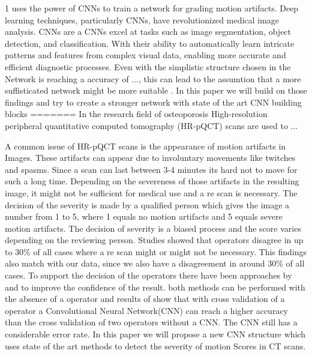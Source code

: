 \documentclass[
a4paper, 
12pt,
grayscalebody, %
abstract=on,
twoside, BCOR10mm, 12pt, DIV13,headinclude, footexclude, final, abstracton, openright
]{ibireprt}
\numberwithin{equation}{chapter}
\numberwithin{table}{chapter}
\numberwithin{figure}{chapter}
\numberwithin{algorithm}{chapter}
\numberwithin{example}{chapter}
\numberwithin{example}{chapter}
\begin{document}
1\cite{Sode2011} uses the power of CNNs to train a network for grading motion artifacts. Deep learning techniques, particularly CNNs, have revolutionized medical image analysis. CNNs are a %
CNNs excel at tasks such as image segmentation, object detection, and classification. With their ability to automatically learn intricate patterns and features from complex visual data, enabling more accurate and efficient diagnostic processes. %
Even with the simplistic structure chosen in \cite{Sode2011} the Network is reaching a accuracy of ..., this can lead to the assumtion that a more suffisticated network might be more suitable . In this paper we will build on those findings and try to create a stronger network with state of the art CNN building blocks 
=======
	In the research field of osteoporosis High-resolution peripheral quantitative computed tomography (HR-pQCT) scans are used to ...%
	
	
	A common issue of HR-pQCT scans is the appearance of motion artifacts in Images. These artifacts can appear due to involuntary movements like twitches and spasms. Since a scan can last between 3-4 minutes its hard not to move for such a long time. Depending on the severeness of those artifacts in the resulting image, it might not be sufficient for medical use and a re scan is necessary. The decision of the severity is made by a qualified person which gives the image a number from 1 to 5, where 1 equals no motion artifacts and 5 equals severe motion artifacts. The decision of severity is a  biased process and the score varies depending on the reviewing person. Studies showed that operators disagree in up to 30\% %
	of all cases where a re scan might or might not be necessary. This findings also match with our data, since we also have a disagreement in around 30\% of all cases. To support the decision of the operators there have been approaches by \cite{Sode2011} and \cite{Walle2023}  to improve the confidence of the result. both methods can be performed with the absence of a operator and results of \cite{Sode2011} show that with cross validation of a operator  a Convolutional Neural Network(CNN) can reach a higher accuracy than the cross validation of two operators without a CNN. The CNN still has a considerable error rate. In this paper we will propose a new CNN structure which uses state of the art methods to detect the severity of motion Scores in CT scans. %
\end{document}
